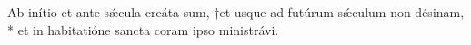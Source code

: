 \begin{flushright}{\fontsize{9}{11}\selectfont{Eccli. 24:14}}\end{flushright}
Ab inítio et ante sǽcula creáta sum, †et usque ad futúrum sǽculum non désinam, * et in habitatióne sancta coram ipso ministrávi.
